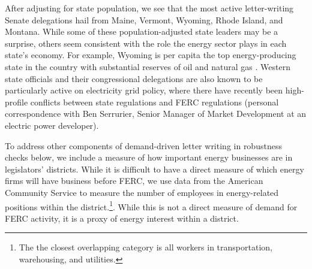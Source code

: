 \documentclass{article}
\begin{document}
After adjusting for state population, we see that the most active letter-writing Senate delegations hail from Maine, Vermont, Wyoming, Rhode Island, and Montana.  While some of these population-adjusted state leaders may be a surprise, others seem consistent with the role the energy sector plays in each state's economy.  For example, Wyoming is per capita the top energy-producing state in the country with substantial reserves of oil and natural gas \citep{Wyoming2019}. Western state officials and their congressional delegations are also known to be particularly active on electricity grid policy, where there have recently been high-profile conflicts between state regulations and FERC regulations (personal correspondence with Ben Serrurier, Senior Manager of Market Development at an electric power developer). 

To address other components of demand-driven letter writing in robustness checks below, we include a measure of how important energy businesses are in legislators' districts.  While it is difficult to have a direct measure of which energy firms will have business before FERC, we use data from the American Community Service to measure the number of employees in energy-related positions within the district.\footnote{The the closest overlapping category is all workers in transportation, warehousing, and utilities.}. While this is not a direct measure of demand for FERC activity, it is a proxy of energy interest within a district. 


\end{document}
